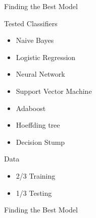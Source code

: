 \begin{frame}{Finding the Best Model}

Tested Classifiers

\begin{itemize}
\item Naive Bayes 
\item Logistic Regression
\item Neural Network
\item Support Vector Machine
\item Adaboost
\item Hoeffding tree
\item Decision Stump
\end{itemize}
Data \begin{itemize}
		\item 2/3 Training
		\item 1/3 Testing
     \end{itemize}
\end{frame}

\begin{frame}{Finding the Best Model}

%
%            

\end{frame}

